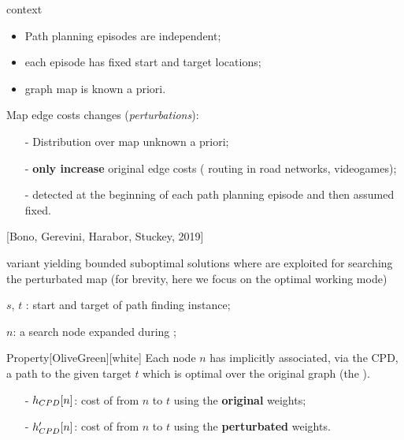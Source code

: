 \begin{frame}{\SAPFEC{} context}
    \begin{itemize}
        \item Path planning episodes are independent;
        \item each episode has fixed start and target locations;
        \item graph map is known a priori.
    \end{itemize}
    
    \medskip
    Map edge costs changes (\textit{perturbations}):
    \begin{itemize}
        \item[-] Distribution over map unknown a priori;
        \item[-] \textbf{only increase} original edge costs (\eg{} routing in road networks, videogames);
        \item[-] detected at the beginning of each path planning episode and then assumed fixed.
    \end{itemize}
\end{frame}


\begin{frame}{\CPDSearch{} [Bono, Gerevini, Harabor, Stuckey, 2019]}
    \vspace{-8pt}
    \begin{block}{\CPDSearch{}}
        \A{} variant yielding bounded suboptimal solutions where \CPDPathsName{} are exploited for searching the perturbated map (for brevity, here we focus on the optimal working mode)
    \end{block}

    $s$, $t$ : start and target of path finding instance;
    
    $n$: a search node expanded during \CPDSearch{};

    \begin{coloredBlock}{Property}[OliveGreen][white]
        Each node $n$ has implicitly associated, via the CPD, a path to the given target $t$ which is optimal over the original graph (the ).
    \end{coloredBlock}

    \vspace{-3pt}
    \begin{block}{}
        \begin{itemize}
            \item[-] $\CPDPathCostOriginal{n}{t}$: cost of \CPDPathName{} from $n$ to $t$ using the \textbf{original} weights;
            \item[-] $\CPDPathCostNew{n}{t}$: cost of \CPDPathName{} from $n$ to $t$ using the \textbf{perturbated} weights.
        \end{itemize} 
    \end{block}
    
\end{frame}


